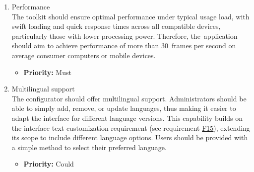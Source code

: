 \begin{enumerate}[label=\textbf{NF\arabic*:}, leftmargin=*]
\item Performance
\vspace{2pt}
\\The toolkit should ensure optimal performance under typical usage load, with swift loading and quick response times across all compatible devices, particularly those with lower processing power. Therefore, the~application should aim to achieve performance of more than 30~frames per second on average consumer computers or mobile devices.
\begin{itemize}[noitemsep, label=\trianglebullet]
    \item \textbf{Priority:} Must
\end{itemize}
\vspace{4pt}

\item \label{itm:NF8} Multilingual support
\vspace{2pt}
\\The configurator should offer multilingual support. Administrators should be able to simply add, remove, or update languages, thus making it easier to adapt the interface for different language versions. This capability builds on the interface text customization requirement (see requirement \hyperref[itm:F15]{F15}), extending its scope to include different language options. Users should be provided with a simple method to select their preferred language.
\begin{itemize}[noitemsep, label=\trianglebullet]
    \item \textbf{Priority:} Could
\end{itemize}
\vspace{4pt}

\end{enumerate}